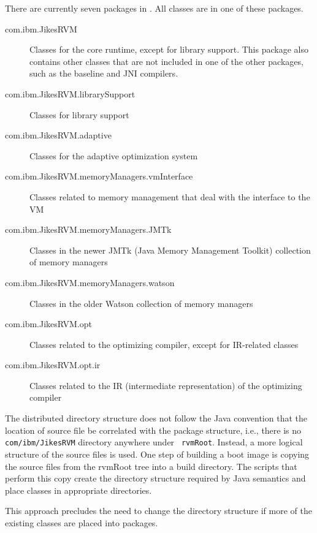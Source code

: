 There are currently seven packages in \jrvm. All classes are in
one of these packages.
\begin{description}
\item [com.ibm.JikesRVM] Classes for the core runtime, except for library
support.  This package also contains other classes that are not
included in one of the other packages, such as the baseline and JNI
compilers. 

\item [com.ibm.JikesRVM.librarySupport] Classes for library support
\item [com.ibm.JikesRVM.adaptive] Classes for the adaptive optimization system

\item [com.ibm.JikesRVM.memoryManagers.vmInterface] Classes related to
memory management that deal with the interface to the VM

\item [com.ibm.JikesRVM.memoryManagers.JMTk] Classes in the newer JMTk
(Java Memory Management Toolkit) collection of memory managers

\item [com.ibm.JikesRVM.memoryManagers.watson] Classes in the older
Watson collection of memory managers

\item [com.ibm.JikesRVM.opt] Classes related to the optimizing
compiler, except for IR-related classes

\item [com.ibm.JikesRVM.opt.ir] Classes related to the IR
(intermediate representation) of the optimizing compiler
\end{description}

The distributed directory structure
does not follow the Java convention that the location of source file
be correlated with the package structure, i.e.,
there is no {\tt com/ibm/JikesRVM} directory anywhere under {\tt
rvmRoot}.  Instead, a more logical structure of the source
files is used.  One step of building a boot image
is copying the source files from the rvmRoot tree into a build
directory.  The scripts that perform this copy create the directory
structure required by Java semantics and place classes in appropriate
directories.

This approach precludes the need to change the directory structure
if more of the existing classes are placed into packages.





